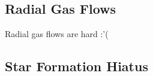 \documentclass[twocolumn,twocolappendix,linenumbers]{aastex631}
\begin{document}

\subsection{Radial Gas Flows}
\label{sec:radial-flows}

Radial gas flows are hard :'(

\subsection{Star Formation Hiatus}
\label{sec:sfe-hiatus}
\end{document}
